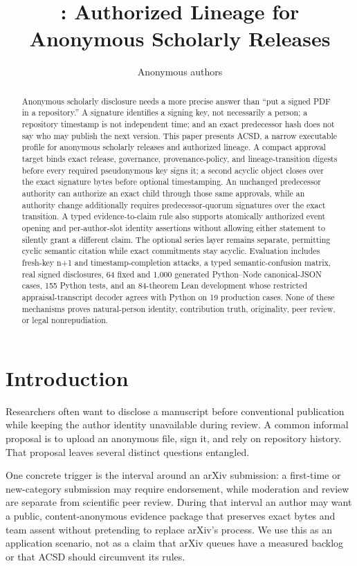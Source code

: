\documentclass[11pt]{article}
\title{\acsd: Authorized Lineage for Anonymous Scholarly Releases}
\author{Anonymous authors}
\date{}
\newcommand{\acsd}{\textsc{ACSD}}
\begin{document}
\maketitle

\begin{abstract}
Anonymous scholarly disclosure needs a more precise answer than ``put a signed PDF in a repository.'' A signature identifies a signing key, not necessarily a person; a repository timestamp is not independent time; and an exact predecessor hash does not say who may publish the next version. This paper presents \acsd, a narrow executable profile for anonymous scholarly releases and authorized lineage. A compact approval target binds exact release, governance, provenance-policy, and lineage-transition digests before every required pseudonymous key signs it; a second acyclic object closes over the exact signature bytes before optional timestamping. An unchanged predecessor authority can authorize an exact child through those same approvals, while an authority change additionally requires predecessor-quorum signatures over the exact transition. A typed evidence-to-claim rule also supports atomically authorized event opening and per-author-slot identity assertions without allowing either statement to silently grant a different claim. The optional series layer remains separate, permitting cyclic semantic citation while exact commitments stay acyclic. Evaluation includes fresh-key n+1 and timestamp-completion attacks, a typed semantic-confusion matrix, real signed disclosures, 64 fixed and 1,000 generated Python--Node canonical-JSON cases, 155 Python tests, and an 84-theorem Lean development whose restricted appraisal-transcript decoder agrees with Python on 19 production cases. None of these mechanisms proves natural-person identity, contribution truth, originality, peer review, or legal nonrepudiation.
\end{abstract}

\section{Introduction}

Researchers often want to disclose a manuscript before conventional publication while keeping the author identity unavailable during review. A common informal proposal is to upload an anonymous file, sign it, and rely on repository history. That proposal leaves several distinct questions entangled.

One concrete trigger is the interval around an arXiv submission: a first-time or
new-category submission may require endorsement, while moderation and review
are separate from scientific peer review. During that interval an author may
want a public, content-anonymous evidence package that preserves exact bytes
and team assent without pretending to replace arXiv's process. We use this as
an application scenario, not as a claim that arXiv queues have a measured
backlog or that ACSD should circumvent its rules.
\end{document}
